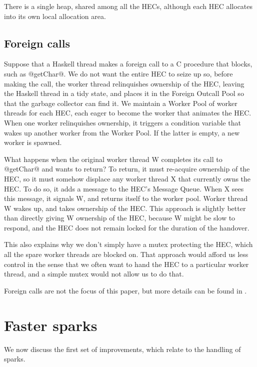 \documentclass[twocolumn,9pt]{sigplanconf}
\begin{document}
There is a single heap, shared among all the HECs, although each HEC
allocates into its own local allocation area.

\subsection{Foreign calls} \label{s:foreign}

Suppose that a Haskell thread makes a foreign call to a C procedure that blocks, such as
@getChar@.  We do not want the entire HEC to seize up so, before making the call,
the worker thread relinquishes ownership of the HEC, leaving the Haskell thread in 
a tidy state, and places it in the Foreign Outcall Pool so that the garbage collector
can find it.
We maintain a Worker Pool of worker threads for each HEC, each eager to become the worker that 
animates the HEC.  When one worker relinquishes ownership, it triggers a condition 
variable that wakes up another worker from the Worker Pool.  If the latter is empty,
a new worker is spawned.

What happens when the original worker thread W completes its call to
@getChar@ and wants to return?  To return, it must re-acquire
ownership of the HEC, so it must somehow displace any worker thread X
that currently owns the HEC.  To do so, it adds a message to the HEC's
Message Queue. When X sees this message, it signals W, and returns
itself to the worker pool.  Worker thread W wakes up, and takes
ownership of the HEC.  This approach is slightly better than directly
giving W ownership of the HEC, because W might be slow to respond, and
the HEC does not remain locked for the duration of the handover.

This also explains why we don't simply have a mutex protecting the
HEC, which all the spare worker threads are blocked on.  That approach
would afford us less control in the sense that we often want to hand
the HEC to a particular worker thread, and a simple mutex would not
allow us to do that.

Foreign calls are not the focus of this paper, but more details can be
found in \cite{concffi04}.

\section{Faster sparks}
\label{s:impl-spark-pool}

We now discuss the first set of improvements, which relate to
the handling of sparks.
\end{document}
